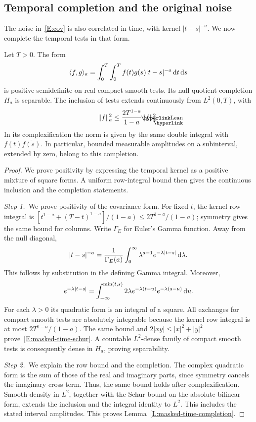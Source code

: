 \subsection{Temporal completion and the original noise}

The noise in~\eqref{E:cov} is also correlated in time, with kernel
$|t-s|^{-a}$. We now complete the temporal tests in that form.

\begin{lemma}\label{L:masked-time-completion}
  Let $T > 0$. The form
  \[
    \langle f,g\rangle_a
    = \int_0^T\int_0^T f(t)g(s)|t-s|^{-a}\,\mathrm{d} t\,\mathrm{d} s
  \]
  is positive semidefinite on real compact smooth tests. Its null-quotient
  completion $H_a$ is separable. The inclusion of tests extends continuously
  from $L^2(0,T)$, with
  \begin{equation}\label{E:masked-time-schur}
    \LeanEqMarker{E:masked-time-schur}
    \|f\|_a^2 \le \frac{2T^{1-a}}{1-a}\|f\|_2^2.
  \end{equation}
  In its complexification the norm is given by the same double integral with
  $f(t)\overline{f(s)}$. In particular, bounded measurable amplitudes on a
  subinterval, extended by zero, belong to this completion.
\end{lemma}

\begin{proof}
  We prove positivity by expressing the temporal kernel as a positive mixture
  of square forms. A uniform row-integral bound then gives the continuous
  inclusion and the completion statements.

  \medskip
  \noindent\textit{Step 1.~}We prove positivity of the covariance form.
  For fixed $t$, the kernel row integral is
  $[t^{1-a}+(T-t)^{1-a}]/(1-a)\le2T^{1-a}/(1-a)$; symmetry gives the same
  bound for columns.
  Write $\Gamma_E$ for Euler's Gamma function. Away from the null diagonal,
  \[
    |t-s|^{-a} = \frac1{\Gamma_E(a)}\int_0^\infty
    \lambda^{a-1}e^{-\lambda|t-s|}\,\mathrm{d}\lambda.
  \]
  This follows by substitution in the defining Gamma integral. Moreover,
  \[
    e^{-\lambda|t-s|}
    = \int_{-\infty}^{\min(t,s)}2\lambda
    e^{-\lambda(t-u)}e^{-\lambda(s-u)}\,\mathrm{d} u.
  \]
  For each $\lambda > 0$ its quadratic form is an integral of a square. All
  exchanges for compact smooth tests are absolutely integrable because the
  kernel row integral is at most $2T^{1-a}/(1-a)$. The same bound and $2|xy| \le
  |x|^2+|y|^2$ prove~\eqref{E:masked-time-schur}. A countable $L^2$-dense family
  of compact smooth tests is consequently dense in $H_a$, proving separability.

  \medskip
  \noindent\textit{Step 2.~}We explain the row bound and the completion.
  The complex quadratic form is the sum of those of the real and imaginary
  parts, since symmetry cancels the imaginary cross term. Thus, the same bound
  holds after complexification. Smooth density in $L^2$, together with the Schur
  bound on the absolute bilinear form, extends the inclusion and the integral
  identity to $L^2$. This includes the stated interval amplitudes. This proves
  Lemma~\ref{L:masked-time-completion}.
\end{proof}

